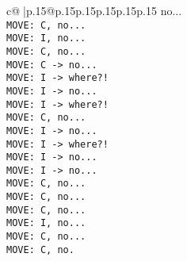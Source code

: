 \documentclass{article}
\begin{document}
{\begin{supertabular}{c@{$\;$}|p{.15\linewidth}@{}p{.15\linewidth}p{.15\linewidth}p{.15\linewidth}p{.15\linewidth}p{.15\linewidth}}
{{{no...\\ \tt  MOVE: C, no...\\ \tt  MOVE: I, no...\\ \tt  MOVE: C, no...\\ \tt  MOVE: C -> no...\\ \tt  MOVE: I -> where?!\\ \tt  MOVE: I -> no...\\ \tt  MOVE: I -> where?!\\ \tt  MOVE: C, no...\\ \tt  MOVE: I -> no...\\ \tt  MOVE: I -> where?!\\ \tt  MOVE: I -> no...\\ \tt  MOVE: I -> no...\\ \tt  MOVE: C, no...\\ \tt  MOVE: C, no...\\ \tt  MOVE: C, no...\\ \tt  MOVE: I, no...\\ \tt  MOVE: C, no...\\ \tt  MOVE: C, no.}}}
\end{supertabular}}
\end{document}
